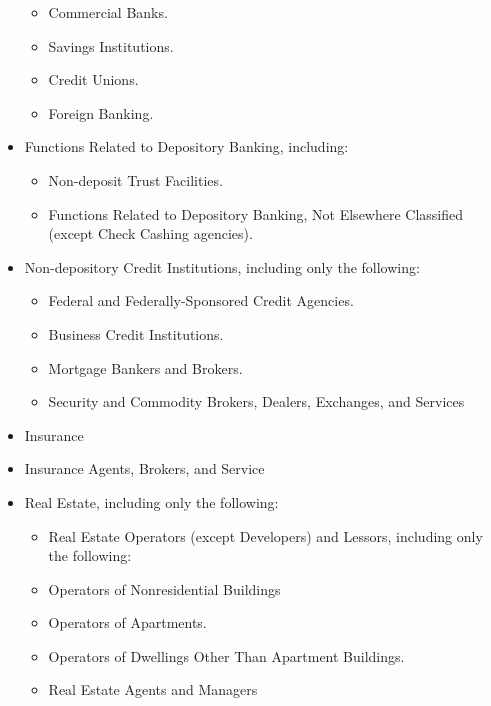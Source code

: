 \begin{itemize}
\begin{itemize}
\item Commercial Banks.

\item Savings Institutions.

\item Credit Unions.

\item Foreign Banking.
\end{itemize}
\item Functions Related to Depository Banking, including:
\begin{itemize}
\item Non-deposit Trust Facilities.

\item Functions Related to Depository Banking, Not Elsewhere Classified (except
Check Cashing agencies).
\end{itemize}
\item Non-depository Credit Institutions, including only the following:
\begin{itemize}
\item Federal and Federally-Sponsored Credit Agencies.

\item Business Credit Institutions.

\item Mortgage Bankers and Brokers.

\item Security and Commodity Brokers, Dealers, Exchanges, and Services 
\end{itemize}
\item Insurance

\item Insurance Agents, Brokers, and Service 

\item Real Estate, including only the following:
\begin{itemize}
\item Real Estate Operators (except Developers) and Lessors, including only the
following:

\item Operators of Nonresidential Buildings 

\item Operators of Apartments.

\item Operators of Dwellings Other Than Apartment Buildings.

\item Real Estate Agents and Managers 


\end{itemize}
\end{itemize}
